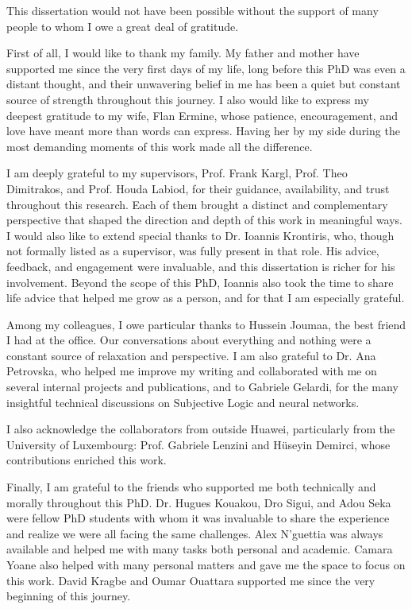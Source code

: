 \documentclass[
11pt, %
english, %
singlespacing, %
headsepline, %
]{MastersDoctoralThesis} %
\begin{document}

\begin{acknowledgements}
\addchaptertocentry{\acknowledgementname} %
This dissertation would not have been possible without the support of many people to whom I owe a great deal of gratitude.

First of all, I would like to thank my family. My father and mother have supported me since the very first days of my life, long before this PhD was even a distant thought, and their unwavering belief in me has been a quiet but constant source of strength throughout this journey. I also would like to express my deepest gratitude to my wife, Flan Ermine, whose patience, encouragement, and love have meant more than words can express. Having her by my side during the most demanding moments of this work made all the difference.

I am deeply grateful to my supervisors, Prof. Frank Kargl, Prof. Theo Dimitrakos, and Prof. Houda Labiod, for their guidance, availability, and trust throughout this research. Each of them brought a distinct and complementary perspective that shaped the direction and depth of this work in meaningful ways. I would also like to extend special thanks to Dr. Ioannis Krontiris, who, though not formally listed as a supervisor, was fully present in that role. His advice, feedback, and engagement were invaluable, and this dissertation is richer for his involvement. Beyond the scope of this PhD, Ioannis also took the time to share life advice that helped me grow as a person, and for that I am especially grateful.

Among my colleagues, I owe particular thanks to Hussein Joumaa, the best friend I had at the office. Our conversations about everything and nothing were a constant source of relaxation and perspective. I am also grateful to Dr. Ana Petrovska, who helped me improve my writing and collaborated with me on several internal projects and publications, and to Gabriele Gelardi, for the many insightful technical discussions on Subjective Logic and neural networks.

I also acknowledge the collaborators from outside Huawei, particularly from the University of Luxembourg: Prof. Gabriele Lenzini and Hüseyin Demirci, whose contributions enriched this work.

Finally, I am grateful to the friends who supported me both technically and morally throughout this PhD. Dr. Hugues Kouakou, Dro Sigui, and Adou Seka were fellow PhD students with whom it was invaluable to share the experience and realize we were all facing the same challenges. Alex N'guettia was always available and helped me with many tasks both personal and academic. Camara Yoane also helped with many personal matters and gave me the space to focus on this work. David Kragbe and Oumar Ouattara supported me since the very beginning of this journey.



\end{acknowledgements}
\end{document}

